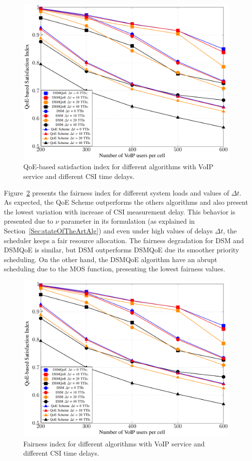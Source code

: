 \documentclass[12pt]{article}
\newcommand{\FigRef}[1]{Figure~\ref{#1}}
\newcommand{\SecRef}[1]{Section~\ref{#1}}
\begin{document}
\begin{figure}
	\centering
	\includegraphics[width=0.55\linewidth,page=1]{figs_wp2/figs_BRUNO_PEDRO/plotsCSI}
	\caption{QoE-based satisfaction index for different algorithms with VoIP service and different CSI time delays.}   
	\label{Fig:SatisfactionRTCSI}
\end{figure}

\FigRef{Fig:FairnessRTCSI} presents the fairness index for different system loads and values of $\Delta t$. As expected, the \ac{QoE} Scheme outperforms the others algorithms and also present the lowest variation with increase of \ac{CSI} measurement delay. This behavior is presented due to $\nu$ parameter in its formulation (as explained in \SecRef{Sec:stateOfTheArtAlg}) and even under high values of delays $\Delta t$, the scheduler keeps a fair resource allocation. The fairness degradation for DSM and DSMQoE is similar, but DSM outperforms DSMQoE due its smoother priority scheduling. On the other hand, the DSMQoE algorithm have an abrupt scheduling due to the MOS function, presenting the lowest fairness values. 

\begin{figure}
	\centering
	\includegraphics[width=0.55\linewidth,page=2]{figs_wp2/figs_BRUNO_PEDRO/plotsCSI}
	\caption{Fairness index for different algorithms with VoIP service and different CSI time delays.}
	\label{Fig:FairnessRTCSI}
\end{figure}
\end{document}
